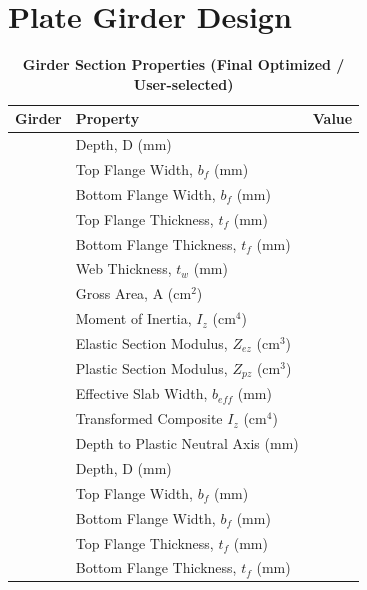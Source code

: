\documentclass[12pt,a4paper]{report}
\numberwithin{table}{chapter}
\numberwithin{figure}{chapter}
\begin{document}
\section{Plate Girder Design}
\label{sec:plate-girder}

\vspace{1em}
\begin{longtable}{|C{2.5cm}|L{8.0cm}|>{\centering\arraybackslash}p{5.0cm}|}
\caption{\textbf{Girder Section Properties (Final Optimized / User-selected)}} \\
\hline
\textbf{Girder} & \textbf{Property} & \textbf{Value} \\[6pt]
\hline
{} & \textnormal{Depth, D (mm)} &  \\[6pt]
 & \textnormal{Top Flange Width, $b_f$ (mm)} &  \\[6pt]
 & \textnormal{Bottom Flange Width, $b_f$ (mm)} &  \\[6pt]
 & \textnormal{Top Flange Thickness, $t_f$ (mm)} &  \\[6pt]
 & \textnormal{Bottom Flange Thickness, $t_f$ (mm)} &  \\[6pt]
 & \textnormal{Web Thickness, $t_w$ (mm)} &  \\[6pt]
 & \textnormal{Gross Area, A (cm$^2$)} &  \\[6pt]
 & \textnormal{Moment of Inertia, $I_z$ (cm$^4$)} &  \\[6pt]
 & \textnormal{Elastic Section Modulus, $Z_{ez}$ (cm$^3$)} &  \\[6pt]
 & \textnormal{Plastic Section Modulus, $Z_{pz}$ (cm$^3$)} &  \\[6pt]
 & \textnormal{Effective Slab Width, $b_{eff}$ (mm)} &  \\[6pt]
 & \textnormal{Transformed Composite $I_z$ (cm$^4$)} &  \\[6pt]
 & \textnormal{Depth to Plastic Neutral Axis (mm)} &  \\[6pt]
\hline
{} & \textnormal{Depth, D (mm)} &  \\[6pt]
 & \textnormal{Top Flange Width, $b_f$ (mm)} &  \\[6pt]
 & \textnormal{Bottom Flange Width, $b_f$ (mm)} &  \\[6pt]
 & \textnormal{Top Flange Thickness, $t_f$ (mm)} &  \\[6pt]
 & \textnormal{Bottom Flange Thickness, $t_f$ (mm)} &  \\[6pt]

\end{longtable}
\end{document}
